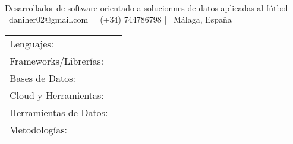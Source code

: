 \documentclass[]{awesome-cv}
\begin{document}
    
\begin{center}
	  \\
	{Desarrollador de software orientado a solucionnes de datos aplicadas al fútbol} \\
	\vspace{2mm}
	{\hspace{0.8cm}\faEnvelope\ daniher02@gmail.com}  |  {\faMobile\ (+34) 744786798}  |  {\faMapMarker\ Málaga, España} 
\end{center}

\begin{cventries}
	\cventry
	{}
	{\def\arraystretch{1.15}{\begin{tabular}{ l l }
		Lenguajes:  & {\skill{ Python, R, SQL, Java, JavaScript, TypeScript, HTML, CSS}} \\
		Frameworks/Librerías:  & {\skill{ Django, FastAPI, Pandas, PySpark, Apache Airflow, React, Spring Boot}} \\
		Bases de Datos:  & {\skill{ PostgreSQL, MySQL, Snowflake, Redis, SQLite}} \\
		Cloud y Herramientas: & {\skill{ AWS (Lambda, SNS, EC2, S3), Azure, Docker, Git, Metabase}} \\
		Herramientas de Datos: & {\skill{ Airflow, Astronomer, Kafka, Celery, ETL Pipelines, MCP Servers}} \\
		Metodologías:  & {\skill{ Agile, Microservicios, DDD, Event Driven Architecture, Data Engineering}} \\
		\end{tabular}}}
	{}
	{}
	{}
\end{cventries}
\vspace{-7mm}
\end{document}
